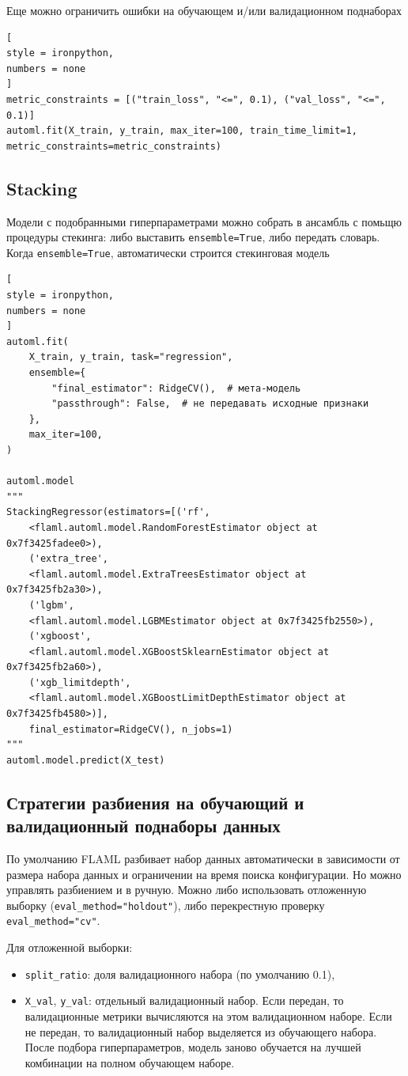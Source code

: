 \documentclass[%
	11pt,
	a4paper,
	utf8,
		]{article}
\begin{document}
Еще можно ограничить ошибки на обучающем и/или валидационном поднаборах
\begin{lstlisting}[
style = ironpython,
numbers = none
]
metric_constraints = [("train_loss", "<=", 0.1), ("val_loss", "<=", 0.1)]
automl.fit(X_train, y_train, max_iter=100, train_time_limit=1, metric_constraints=metric_constraints)
\end{lstlisting}

\subsection{Stacking}

Модели с подобранными гиперпараметрами можно собрать в ансамбль с помьщю процедуры стекинга: либо выставить \verb|ensemble=True|, либо передать словарь. Когда \verb|ensemble=True|, автоматически строится стекинговая модель
\begin{lstlisting}[
style = ironpython,
numbers = none
]
automl.fit(
    X_train, y_train, task="regression",
    ensemble={
        "final_estimator": RidgeCV(),  # мета-модель
        "passthrough": False,  # не передавать исходные признаки
    },
    max_iter=100,
)

automl.model
"""
StackingRegressor(estimators=[('rf',
	<flaml.automl.model.RandomForestEstimator object at 0x7f3425fadee0>),
	('extra_tree',
	<flaml.automl.model.ExtraTreesEstimator object at 0x7f3425fb2a30>),
	('lgbm',
	<flaml.automl.model.LGBMEstimator object at 0x7f3425fb2550>),
	('xgboost',
	<flaml.automl.model.XGBoostSklearnEstimator object at 0x7f3425fb2a60>),
	('xgb_limitdepth',
	<flaml.automl.model.XGBoostLimitDepthEstimator object at 0x7f3425fb4580>)],
	final_estimator=RidgeCV(), n_jobs=1)
"""
automl.model.predict(X_test)
\end{lstlisting}

\subsection{Стратегии разбиения на обучающий и валидационный поднаборы данных}

По умолчанию FLAML разбивает набор данных автоматически в зависимости от размера набора данных и ограничении на время поиска конфигурации. Но можно управлять разбиением и в ручную. Можно либо использовать отложенную выборку (\verb|eval_method="holdout"|), либо перекрестную проверку \verb|eval_method="cv"|.

Для отложенной выборки:
\begin{itemize}
	\item \verb|split_ratio|: доля валидационного набора (по умолчанию 0.1),
	
	\item \verb|X_val|, \verb|y_val|: отдельный валидационный набор. Если передан, то валидационные метрики вычисляются на этом валидационном наборе. Если не передан, то валидационный набор выделяется из обучающего набора. После подбора гиперпараметров, модель заново обучается на лучшей комбинации на полном обучающем наборе.
\end{itemize}
\end{document}
